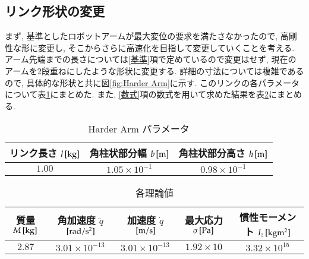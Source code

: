 \documentclass[10pt,b5paper,papersize,dvipdfmx]{jsbook}
\begin{document}
\subsection{リンク形状の変更}
まず, 基準としたロボットアームが最大変位の要求を満たさなかったので, 高剛性な形に変更し, そこからさらに高速化を目指して変更していくことを考える. アーム先端までの長さについては\ref{基準}項で定めているので変更はせず, 現在のアームを2段重ねにしたような形状に変更する. 詳細の寸法については複雑であるので, 具体的な形状と共に図\ref{fig:Harder Arm}に示す. このリンクの各パラメータについて表\ref{tbl:Harder Arm パラメータ}にまとめた. また, \ref{数式}項の数式を用いて求めた結果を表\ref{tbl:各理論値}にまとめる.
\begin{table}[H]
  \centering
  \caption{Harder Arm パラメータ}
  \label{tbl:Harder Arm パラメータ}
  \begin{tabular}{|c|c|c|} \hline
    リンク長さ $l\tani*{kg}$ & 角柱状部分幅 $b\tani*{m}$ & 角柱状部分高さ $h\tani*{m}$ \\ \hline
    $1.00$ & $1.05\times 10^{-1}$ & $0.98\times 10^{-1}$ \\ \hline
  \end{tabular}
\end{table}
\begin{table}[H]
  \centering
  \caption{各理論値}
  \label{tbl:各理論値}
  \begin{tabular}{|c|c|c|c|c|} \hline
    質量 $M\tani*{kg}$ & 角加速度 $\ddot{q} $$\tani*{rad/s^2}$ & 加速度 $\dot{q}$$\tani*{m/s}$ & 最大応力 $\sigma\tani*{Pa}$ & 慣性モーメント $I_z\tani*{kgm^2}$ \\ \hline
    $2.87$ & $3.01\times 10^{-13}$ & $3.01\times 10^{-13}$ & $1.92\times 10$ & $3.32\times 10^{15}$ \\ \hline
  \end{tabular}
\end{table}
\end{document}
